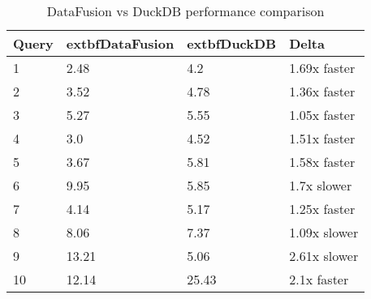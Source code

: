 \begin{table}[h]
\centering
\begin{tabular}{|l|l|l|l|}
\hline
Query & 	extbf{DataFusion} & 	extbf{DuckDB} & Delta \\
\hline
1 & 2.48 & 4.2 & 1.69x faster \\
\hline
2 & 3.52 & 4.78 & 1.36x faster \\
\hline
3 & 5.27 & 5.55 & 1.05x faster \\
\hline
4 & 3.0 & 4.52 & 1.51x faster \\
\hline
5 & 3.67 & 5.81 & 1.58x faster \\
\hline
6 & 9.95 & 5.85 & 1.7x slower \\
\hline
7 & 4.14 & 5.17 & 1.25x faster \\
\hline
8 & 8.06 & 7.37 & 1.09x slower \\
\hline
9 & 13.21 & 5.06 & 2.61x slower \\
\hline
10 & 12.14 & 25.43 & 2.1x faster \\
\hline
\end{tabular}
\caption{DataFusion vs DuckDB performance comparison}
\label{table:1}
\end{table}